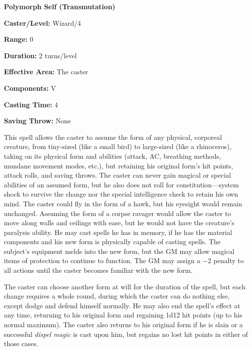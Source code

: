\begin{multicols}{2}
\vspace{1em}

\noindent
\begin{minipage}{\columnwidth}

\noindent \textbf{Polymorph Self (Transmutation)}

\noindent \textbf{Caster/Level:} Wizard/4

\noindent \textbf{Range:} 0

\noindent \textbf{Duration:} 2 turns/level

\noindent \textbf{Effective Area:} The caster

\noindent \textbf{Components:} V

\noindent \textbf{Casting Time:} 4

\noindent \textbf{Saving Throw:} None

\end{minipage}

This spell allows the caster to assume the form of any physical, corporeal creature, from tiny-sized (like a small bird) to large-sized (like a rhinoceros), taking on its physical form and abilities (attack, AC, breathing methods, mundane movement modes, etc.), but retaining his original form's hit points, attack rolls, and saving throws.  The caster can never gain magical or special abilities of an assumed form, but he also does not roll for constitution---system shock to survive the change nor the special intelligence check to retain his own mind.  The caster could fly in the form of a hawk, but his eyesight would remain unchanged.  Assuming the form of a corpse ravager would allow the caster to move along walls and ceilings with ease, but he would not have the creature's paralysis ability.  He may cast spells he has in memory, if he has the material components and his new form is physically capable of casting spells.  The subject's equipment melds into the new form, but the GM may allow magical items of protection to continue to function.  The GM may assign a $-2$ penalty to all actions until the caster becomes familiar with the new form.

The caster can choose another form at will for the duration of the spell, but each change requires a whole round, during which the caster can do nothing else, except dodge and defend himself normally. He may also end the spell's effect at any time, returning to his original form and regaining 1d12 hit points (up to his normal maximum).  The caster also returns to his original form if he is slain or a successful \textit{dispel magic} is cast upon him, but regains no lost hit points in either of those cases.  


\end{multicols}
